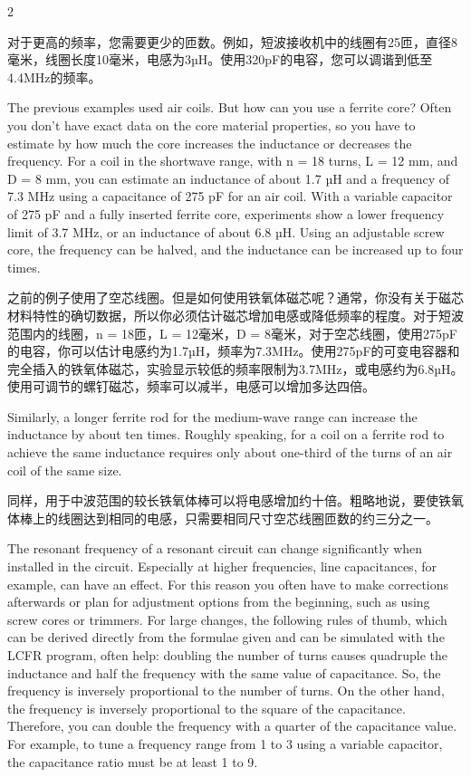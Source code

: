 \documentclass{ctexbook}
\begin{document}
\begin{paracol}{2}
\switchcolumn

对于更高的频率，您需要更少的匝数。例如，短波接收机中的线圈有25匝，直径8毫米，线圈长度10毫米，电感为3µH。使用320pF的电容，您可以调谐到低至4.4MHz的频率。

\switchcolumn*

The previous examples used air coils. But how can you use a ferrite core? Often you don't 
have exact data on the core material properties, so you have to estimate by how much 
the core increases the inductance or decreases the frequency. For a coil in the shortwave 
range, with n = 18 turns, L = 12 mm, and D = 8 mm, you can estimate an inductance of 
about 1.7 µH and a frequency of 7.3 MHz using a capacitance of 275 pF for an air coil. With 
a variable capacitor of 275 pF and a fully inserted ferrite core, experiments show a lower 
frequency limit of 3.7 MHz, or an inductance of about 6.8 µH. Using an adjustable screw 
core, the frequency can be halved, and the inductance can be increased up to four times. 

\switchcolumn

之前的例子使用了空芯线圈。但是如何使用铁氧体磁芯呢？通常，你没有关于磁芯材料特性的确切数据，所以你必须估计磁芯增加电感或降低频率的程度。对于短波范围内的线圈，n = 18匝，L = 12毫米，D = 8毫米，对于空芯线圈，使用275pF的电容，你可以估计电感约为1.7µH，频率为7.3MHz。使用275pF的可变电容器和完全插入的铁氧体磁芯，实验显示较低的频率限制为3.7MHz，或电感约为6.8µH。使用可调节的螺钉磁芯，频率可以减半，电感可以增加多达四倍。

\switchcolumn*

Similarly, a longer ferrite rod for the medium-wave range can increase the inductance by 
about ten times. Roughly speaking, for a coil on a ferrite rod to achieve the same inductance requires only about one-third of the turns of an air coil of the same size.

\switchcolumn

同样，用于中波范围的较长铁氧体棒可以将电感增加约十倍。粗略地说，要使铁氧体棒上的线圈达到相同的电感，只需要相同尺寸空芯线圈匝数的约三分之一。

\switchcolumn*

The resonant frequency of a resonant circuit can change significantly when installed in the 
circuit. Especially at higher frequencies, line capacitances, for example, can have an effect. 
For this reason you often have to make corrections afterwards or plan for adjustment options from the beginning, such as using screw cores or trimmers. For large changes, the 
following rules of thumb, which can be derived directly from the formulae given and can be 
simulated with the LCFR program, often help: doubling the number of turns causes quadruple the inductance and half the frequency with the same value of capacitance. So, the 
frequency is inversely proportional to the number of turns. On the other hand, the frequency is inversely proportional to the square of the capacitance. Therefore, you can double the 
frequency with a quarter of the capacitance value. For example, to tune a frequency range 
from 1 to 3 using a variable capacitor, the capacitance ratio must be at least 1 to 9. 


\end{paracol}
\end{document}
